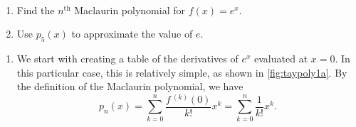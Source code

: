 \begin{example}\label{ex_taypoly1}%
\mbox{}\\[-2\baselineskip]\parbox[t]{\linewidth}{%
\begin{enumerate}
	\item	Find the $n^{\text{th}}$ Maclaurin polynomial for $f(x) = e^x$.
	\item	Use $p_5(x)$ to approximate the value of $e$.
\end{enumerate}}\vspace{0pt}
\solution
{}
\begin{enumerate}
\item We start with creating a table of the derivatives of $e^x$ evaluated at $x=0$. In this particular case, this is relatively simple, as shown in \autoref{fig:taypoly1a}. By the definition of the Maclaurin polynomial, we have 
\[
	p_n(x)
	=\sum_{k=0}^n\frac{f\,^{(k)}(0)}{k!}x^k
	=\sum_{k=0}^n\frac1{k!}x^k.
\]


\end{enumerate}
\end{example}
